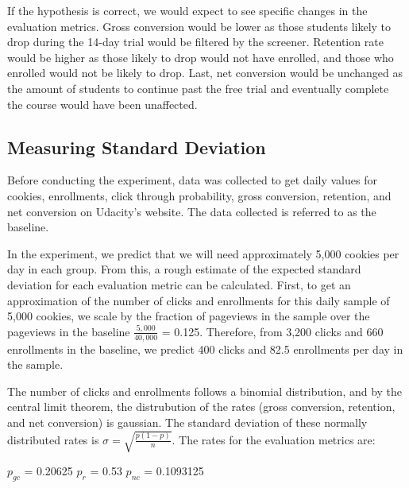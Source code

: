 \documentclass[paper=a4, fontsize=11pt]{scrartcl} %
\numberwithin{equation}{section} %
\numberwithin{figure}{section} %
\numberwithin{table}{section} %
\begin{document}
If the hypothesis is correct, we would expect to see specific changes in the evaluation metrics.  Gross conversion would be lower as those students likely to drop during the 14-day trial would be filtered by the screener.  Retention rate would be higher as those likely to drop would not have enrolled, and those who enrolled would not be likely to drop.  Last, net conversion would be unchanged as the amount of students to continue past the free trial and eventually complete the course would have been unaffected. \newline


\subsection{Measuring Standard Deviation}

Before conducting the experiment, data was collected to get daily values for cookies, enrollments, click through probability, gross conversion, retention, and net conversion on Udacity's website.  The data collected is referred to as the baseline. \newline

In the experiment, we predict that we will need approximately 5,000 cookies per day in each group.  From this, a rough estimate of the expected standard deviation for each evaluation metric can be calculated.  First, to get an approximation of the number of clicks and enrollments for this daily sample of 5,000 cookies, we scale by the fraction of pageviews in the sample over the pageviews in the baseline $\frac{5,000}{40,000}$ = 0.125.  Therefore, from 3,200 clicks and 660 enrollments in the baseline, we predict 400 clicks and 82.5 enrollments per day in the sample. \newline

The number of clicks and enrollments follows a binomial distribution, and by the central limit theorem, the distrubution of the rates (gross conversion, retention, and net conversion) is gaussian. The standard deviation of these normally distributed rates is $\sigma = \sqrt{\frac{p(1-p)}{n}}$.  The rates for the evaluation metrics are: \newline

$p_{gc}$ = 0.20625\newline
$p_{r}$ = 0.53\newline
$p_{nc}$ = 0.1093125
\newline
\end{document}
